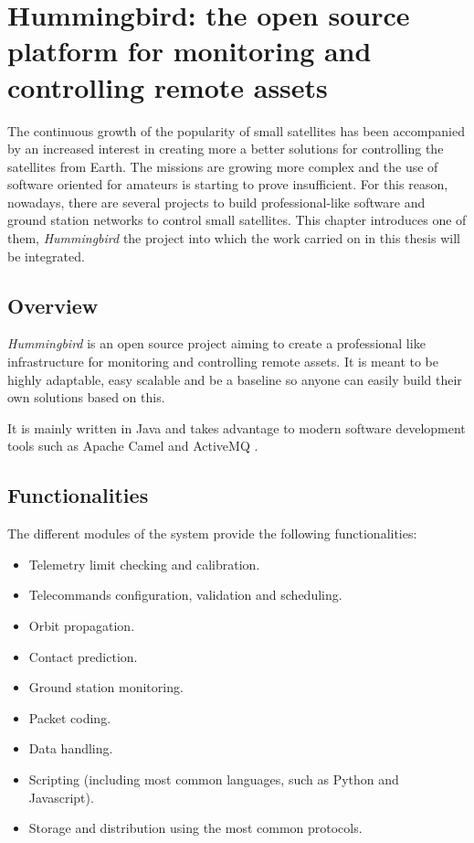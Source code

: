 
\chapter{Hummingbird: the open source platform for monitoring and controlling remote assets}\label{chapter3}

The continuous growth of the popularity of small satellites has been accompanied by an increased interest in creating more a better solutions for controlling the satellites from Earth. The missions are growing more complex and the use of software oriented for amateurs is starting to prove insufficient. For this reason, nowadays, there are  several projects to build professional-like software and ground station networks to control small satellites. This chapter introduces one of them, \emph{Hummingbird} \citep{HBird} the project into which the work carried on in this thesis will be integrated. 

\section{Overview} 

\emph{Hummingbird} is an open source project aiming to create a professional like infrastructure for monitoring and controlling remote assets. It is meant to be highly adaptable, easy scalable and be a baseline so anyone can easily build their own solutions based on this. 

It is mainly written in Java \cite{Java} and takes advantage to modern software development tools such as Apache Camel \cite{Camel} and ActiveMQ \cite{AMQ}. 
\pagebreak
\section{Functionalities}

The different modules of the system provide the following functionalities: \cite{Elo}

\begin{itemize}
\item Telemetry limit checking and calibration.
\item Telecommands configuration, validation and scheduling.
\item Orbit propagation.
\item Contact prediction.
\item Ground station monitoring.
\item Packet coding.
\item Data handling.
\item Scripting (including most common languages, such as Python and Javascript).
\item Storage and distribution using the most common protocols.

\end{itemize}



